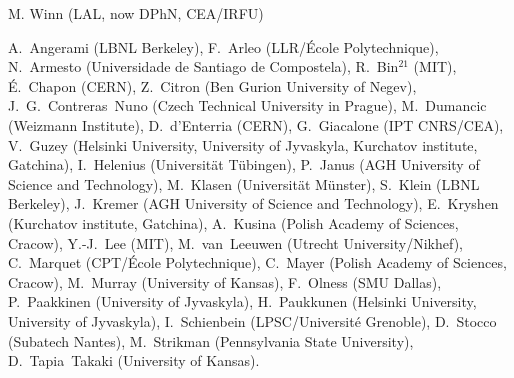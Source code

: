 { \small
{} M. Winn (LAL, now DPhN, CEA/IRFU) %

 A.~Angerami (LBNL Berkeley), %
 F.~Arleo (LLR/{\'E}cole Polytechnique), %
 N.~Armesto (Universidade de Santiago de Compostela), %
 R.~Bin$^{21}$ (MIT), %
 {\'E}.~Chapon (CERN), %
 Z.~Citron (Ben Gurion University of Negev), %
 J.~G.~Contreras~Nuno (Czech Technical University in Prague),  %
 M.~Dumancic (Weizmann Institute),
 D.~d'Enterria (CERN), %
 G.~Giacalone (IPT CNRS/CEA), %
 V.~Guzey (Helsinki University, University of Jyvaskyla, Kurchatov institute, Gatchina),  %
 I.~Helenius (Universit\"{a}t T\"{u}bingen), %
P.~Janus (AGH University of Science and Technology),
M.~Klasen (Universit\"{a}t M\"{u}nster), %
S.~Klein (LBNL Berkeley), %
J.~Kremer (AGH University of Science and Technology),
 E.~Kryshen (Kurchatov institute, Gatchina), %
 A.~Kusina (Polish Academy of Sciences, Cracow), %
 Y.-J.~Lee (MIT), %
 M.~van~Leeuwen (Utrecht University/Nikhef), %
 C.~Marquet (CPT/{\'E}cole Polytechnique), %
 C.~Mayer  (Polish Academy of Sciences, Cracow), %
 M.~Murray (University of Kansas),%
 F.~Olness (SMU Dallas), %
 P.~Paakkinen (University of Jyvaskyla),%
 H.~Paukkunen (Helsinki University, University of Jyvaskyla), %
 I.~Schienbein (LPSC/Universit{\'e} Grenoble), %
 D.~Stocco (Subatech Nantes), %
 M.~Strikman (Pennsylvania State University), %
 D.~Tapia~Takaki (University of Kansas). %
}

